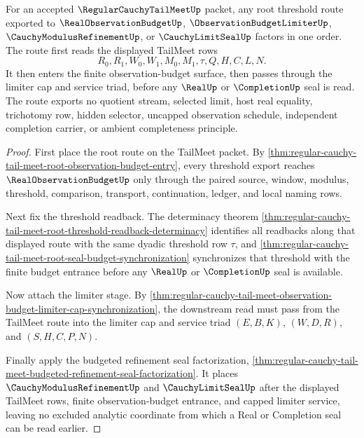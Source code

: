 \begin{theorem}
\label{thm:regular-cauchy-tail-meet-root-budget-limiter-factorization}
For an accepted $\RegularCauchyTailMeetUp$ packet, any root threshold route exported to $\RealObservationBudgetUp$, $\ObservationBudgetLimiterUp$, $\CauchyModulusRefinementUp$, or $\CauchyLimitSealUp$ factors in one order. The route first reads the displayed TailMeet rows
$$
R_0,R_1,W_0,W_1,M_0,M_1,\tau,Q,H,C,L,N.
$$
It then enters the finite observation-budget surface, then passes through the limiter cap and service triad, before any $\RealUp$ or $\CompletionUp$ seal is read. The route exports no quotient stream, selected limit, host real equality, trichotomy row, hidden selector, uncapped observation schedule, independent completion carrier, or ambient completeness principle.
\end{theorem}
\begin{proof}
First place the root route on the TailMeet packet. By \autoref{thm:regular-cauchy-tail-meet-root-observation-budget-entry}, every threshold export reaches $\RealObservationBudgetUp$ only through the paired source, window, modulus, threshold, comparison, transport, continuation, ledger, and local naming rows.

Next fix the threshold readback. The determinacy theorem \autoref{thm:regular-cauchy-tail-meet-root-threshold-readback-determinacy} identifies all readbacks along that displayed route with the same dyadic threshold row $\tau$, and \autoref{thm:regular-cauchy-tail-meet-root-seal-budget-synchronization} synchronizes that threshold with the finite budget entrance before any $\RealUp$ or $\CompletionUp$ seal is available.

Now attach the limiter stage. By \autoref{thm:regular-cauchy-tail-meet-observation-budget-limiter-cap-synchronization}, the downstream read must pass from the TailMeet route into the limiter cap and service triad $(E,B,K)$, $(W,D,R)$, and $(S,H,C,P,N)$.

Finally apply the budgeted refinement seal factorization, \autoref{thm:regular-cauchy-tail-meet-budgeted-refinement-seal-factorization}. It places $\CauchyModulusRefinementUp$ and $\CauchyLimitSealUp$ after the displayed TailMeet rows, finite observation-budget entrance, and capped limiter service, leaving no excluded analytic coordinate from which a Real or Completion seal can be read earlier.
\end{proof}


